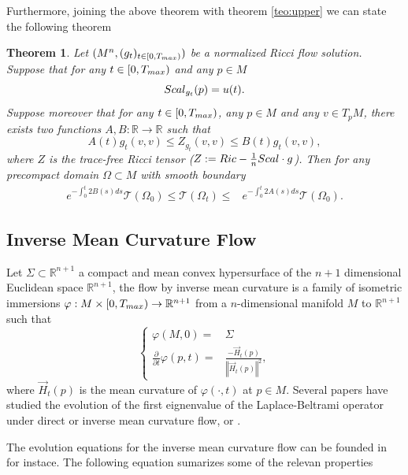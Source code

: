 \documentclass{amsart}
\newtheorem{theorem}{Theorem}[section]
\theoremstyle{definition}
\theoremstyle{remark}
\newcommand{\Ric}{{\rm Ric}}
\begin{document}
Furthermore, joining the above theorem with theorem \ref{teo:upper} we can state the following theorem
\begin{theorem}
Let $(M^n,(g_t)_{t\in [0,T_{\rm max})})$ be a normalized Ricci flow solution. Suppose that for any $t\in [0,T_{\rm max})$ and any $p\in M$ 
$$
{\rm Scal}_{g_t}(p)=u(t).
$$
Suppose moreover that  for any $t\in [0,T_{\rm max})$, any $p\in M$ and any $v\in T_pM$, there exists two functions $A,B:\mathbb{R}\to\mathbb{R}$ such that 
$$
A(t)g_t(v,v)\leq Z_{g_t}(v,v)\leq B(t)g_t(v,v), 
$$
where $Z$ is the trace-free Ricci tensor ($Z:=\Ric-\frac{1}{n}{\rm Scal}\cdot g$). 
Then for any precompact domain $\Omega\subset M$ with smooth boundary 
$$
\begin{aligned}
 e^{-\int_0^t2B(s)ds}\mathcal{T}(\Omega_0)\leq\mathcal{T}(\Omega_t)\leq& e^{-\int_0^t2A(s)ds}\mathcal{T}(\Omega_0). 
\end{aligned}
$$    
\end{theorem}

\subsection{Inverse Mean Curvature Flow}\label{sec:IMCF}
Let $\Sigma\subset \mathbb{R}^{n+1}$ a compact and mean convex hypersurface of the $n+1$ dimensional Euclidean space $\mathbb{R}^{n+1}$, the flow by inverse mean curvature is a family of isometric immersions $\varphi:M\times[0,T_{\rm max})\to \mathbb{R}^{n+1}$ from a $n$-dimensional manifold $M$ to $\mathbb{R}^{n+1}$
such that
\begin{equation}\label{eq:IMCF}  
\left\{
\begin{aligned}
    \varphi(M,0)=&\Sigma\\
    \frac{\partial}{\partial t}\varphi(p,t)=&\frac{-\Vec{H}_t(p)}{\left\Vert \Vec{H}_t(p)\right\Vert^2},
\end{aligned}\right.
\end{equation}
where $\Vec{H}_t(p)$ is the mean curvature of $\varphi(\cdot,t)$ at $p\in M$. Several papers have studied the evolution of the first eignenvalue of the Laplace-Beltrami operator under direct or inverse mean curvature flow, \cite{Ho-Pyo} or \cite{Lambert2016inver-34677} . 

The evolution equations for the inverse mean curvature flow can be founded in \cite{Gerhard1999} for instace. The following equation sumarizes some of the relevan properties
\end{document}
